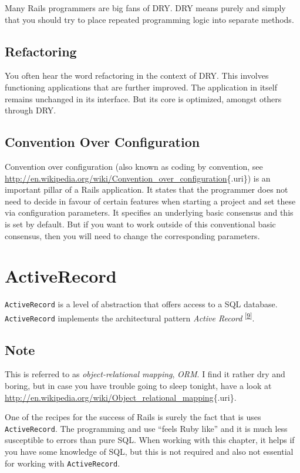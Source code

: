 \documentclass[a4paper]{book}
\newcounter{tab}[chapter]
\newcommand{\chap}[1]{\newpage\thispagestyle{empty}\chapter{#1}\label{chap:\thechapter}}
\begin{document}
Many Rails programmers are big fans of DRY. DRY means purely and simply that you should try to place repeated programming logic into separate methods.

\section{Refactoring}\label{refactoring}

You often hear the word refactoring in the context of DRY. This involves functioning applications that are further improved. The application in itself remains unchanged in its interface. But its core is optimized, amongst others through DRY.

\section{Convention Over Configuration}\label{convention-over-configuration}

Convention over configuration (also known as coding by convention, see \url{http://en.wikipedia.org/wiki/Convention_over_configuration}\{.uri\}) is an important pillar of a Rails application. It states that the programmer does not need to decide in favour of certain features when starting a project and set these via configuration parameters. It specifies an underlying basic consensus and this is set by default. But if you want to work outside of this conventional basic consensus, then you will need to change the corresponding parameters.

\chap{ActiveRecord}\label{activerecord}

\texttt{ActiveRecord} is a level of abstraction that offers access to a SQL database. \texttt{ActiveRecord} implements the architectural pattern \emph{Active Record} \textsuperscript{{[}\hyperref[ftn.idp2940224]{9}{]}}.

\section{Note}\label{note-20}

This is referred to as \emph{object-relational mapping}, \emph{ORM}. I find it rather dry and boring, but in case you have trouble going to sleep tonight, have a look at \url{http://en.wikipedia.org/wiki/Object_relational_mapping}\{.uri\}.

One of the recipes for the success of Rails is surely the fact that is uses \texttt{ActiveRecord}. The programming and use “feels Ruby like” and it is much less susceptible to errors than pure SQL. When working with this chapter, it helps if you have some knowledge of SQL, but this is not required and also not essential for working with \texttt{ActiveRecord}.
\end{document}
